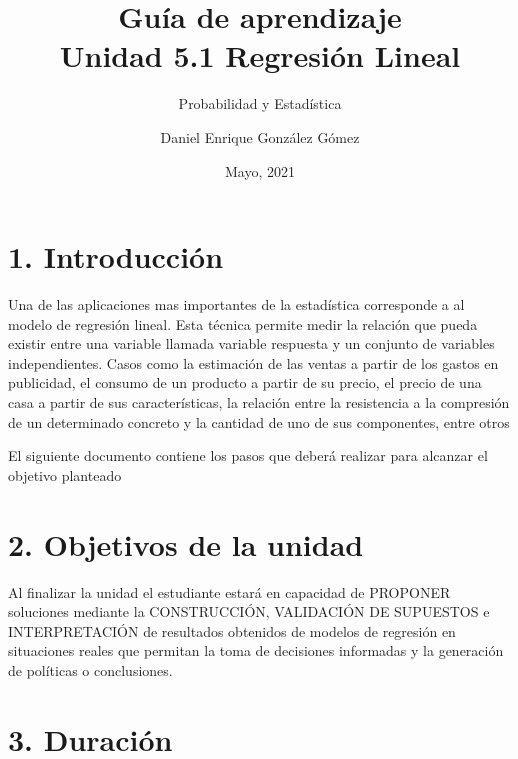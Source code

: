 \documentclass[base=hide,11pt]{elegantbook}
\title{Guía de  aprendizaje \\
	Unidad  5.1 Regresión Lineal}
\subtitle{Probabilidad y Estadística}
\author{Daniel Enrique González Gómez}
\institute{Pontificia Universidad Javeriana Cali}
\date{Mayo, 2021}
\begin{document}

\maketitle

\frontmatter
%
\mainmatter
\section*{1. Introducción}
Una de las aplicaciones mas importantes de la estadística corresponde a al modelo de regresión lineal. Esta técnica permite medir la relación que pueda existir entre una variable llamada variable respuesta  y un conjunto de variables independientes. Casos como la estimación de las ventas a partir de los gastos en publicidad, el consumo de un producto a partir de su precio, el precio de una casa a partir de sus características, la relación entre la resistencia a la compresión de un determinado concreto y la cantidad de uno de sus componentes,  entre otros

El siguiente documento contiene los pasos que deberá realizar para  alcanzar el objetivo planteado


\section*{2. Objetivos de la unidad}

Al finalizar la unidad el estudiante estará en capacidad de PROPONER soluciones mediante la CONSTRUCCIÓN, VALIDACIÓN DE SUPUESTOS e INTERPRETACIÓN de resultados obtenidos de modelos de regresión en situaciones reales que permitan la toma de decisiones informadas y la generación de políticas o conclusiones.
 
\section*{3. Duración}
\end{document}
